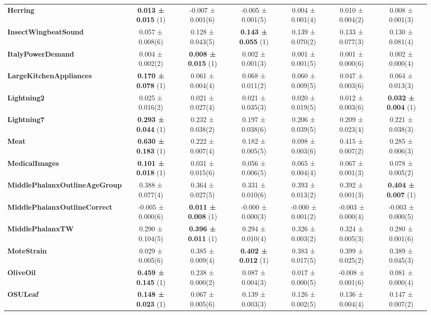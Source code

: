 \begin{table}[ht]
\begin{adjustbox}{width=\textwidth}
\begin{tabular}{lcccccc}
    \textbf{Herring} & \textbf{0.013 ± 0.015} (1) & -0.007 ± 0.001(6) & -0.005 ± 0.001(5) & 0.004 ± 0.001(4) & 0.010 ± 0.004(2) & 0.008 ± 0.001(3) \\
    \textbf{InsectWingbeatSound} & 0.057 ± 0.008(6) & 0.128 ± 0.043(5) & \textbf{0.143 ± 0.055} (1) & 0.139 ± 0.070(2) & 0.133 ± 0.077(3) & 0.130 ± 0.081(4) \\
    \textbf{ItalyPowerDemand} & 0.004 ± 0.002(2) & \textbf{0.008 ± 0.015} (1) & 0.002 ± 0.001(3) & 0.001 ± 0.001(5) & 0.001 ± 0.000(6) & 0.002 ± 0.000(4) \\
    \textbf{LargeKitchenAppliances} & \textbf{0.170 ± 0.078} (1) & 0.061 ± 0.004(4) & 0.068 ± 0.011(2) & 0.060 ± 0.009(5) & 0.047 ± 0.003(6) & 0.064 ± 0.013(3) \\
    \textbf{Lightning2} & 0.025 ± 0.016(2) & 0.021 ± 0.027(4) & 0.021 ± 0.035(3) & 0.020 ± 0.019(5) & 0.012 ± 0.003(6) & \textbf{0.032 ± 0.004} (1) \\
    \textbf{Lightning7} & \textbf{0.293 ± 0.044} (1) & 0.232 ± 0.038(2) & 0.197 ± 0.038(6) & 0.206 ± 0.039(5) & 0.209 ± 0.023(4) & 0.221 ± 0.038(3) \\
    \textbf{Meat} & \textbf{0.630 ± 0.183} (1) & 0.222 ± 0.007(4) & 0.182 ± 0.005(5) & 0.098 ± 0.003(6) & 0.415 ± 0.007(2) & 0.285 ± 0.006(3) \\
    \textbf{MedicalImages} & \textbf{0.101 ± 0.018} (1) & 0.031 ± 0.015(6) & 0.056 ± 0.006(5) & 0.065 ± 0.004(4) & 0.067 ± 0.001(3) & 0.078 ± 0.005(2) \\
    \textbf{MiddlePhalanxOutlineAgeGroup} & 0.388 ± 0.077(4) & 0.364 ± 0.027(5) & 0.331 ± 0.010(6) & 0.393 ± 0.013(2) & 0.392 ± 0.001(3) & \textbf{0.404 ± 0.007} (1) \\
    \textbf{MiddlePhalanxOutlineCorrect} & -0.005 ± 0.000(6) & \textbf{0.011 ± 0.008} (1) & -0.000 ± 0.000(3) & -0.000 ± 0.001(2) & -0.003 ± 0.000(4) & -0.003 ± 0.000(5) \\
    \textbf{MiddlePhalanxTW} & 0.290 ± 0.104(5) & \textbf{0.396 ± 0.011} (1) & 0.294 ± 0.010(4) & 0.326 ± 0.003(2) & 0.324 ± 0.005(3) & 0.280 ± 0.001(6) \\
    \textbf{MoteStrain} & 0.029 ± 0.005(6) & 0.385 ± 0.009(4) & \textbf{0.402 ± 0.012} (1) & 0.383 ± 0.017(5) & 0.399 ± 0.025(2) & 0.389 ± 0.045(3) \\
    \textbf{OliveOil} & \textbf{0.459 ± 0.145} (1) & 0.238 ± 0.000(2) & 0.087 ± 0.004(3) & 0.017 ± 0.000(5) & -0.008 ± 0.001(6) & 0.081 ± 0.000(4) \\
    \textbf{OSULeaf} & \textbf{0.148 ± 0.023} (1) & 0.067 ± 0.005(6) & 0.139 ± 0.003(3) & 0.126 ± 0.002(5) & 0.136 ± 0.004(4) & 0.147 ± 0.007(2) \\

\end{tabular}
\end{adjustbox}
\end{table}
